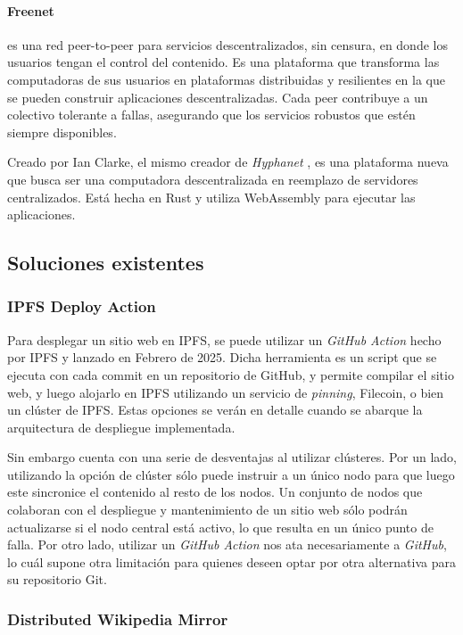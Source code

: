 \paragraph{Freenet} \cite{freenet} es una red peer-to-peer para servicios descentralizados, sin censura, en donde los usuarios tengan el control del contenido. Es una plataforma que transforma las computadoras de sus usuarios en plataformas distribuidas y resilientes en la que se pueden construir aplicaciones descentralizadas. Cada peer contribuye a un colectivo tolerante a fallas, asegurando que los servicios robustos que estén siempre disponibles.

Creado por Ian Clarke, el mismo creador de \textit{Hyphanet} \cite{hyphanet}, es una plataforma nueva que busca ser una computadora descentralizada en reemplazo de servidores centralizados. Está hecha en Rust y utiliza WebAssembly para ejecutar las aplicaciones.


\subsection{Soluciones existentes}

\subsubsection{IPFS Deploy Action}
Para desplegar un sitio web en IPFS, se puede utilizar un \textit{GitHub Action} hecho por IPFS y lanzado en Febrero de 2025. Dicha herramienta es un script que se ejecuta con cada commit en un repositorio de GitHub, y permite compilar el sitio web, y luego alojarlo en IPFS utilizando un servicio de \textit{pinning}, Filecoin, o bien un clúster de IPFS. Estas opciones se verán en detalle cuando se abarque la arquitectura de despliegue implementada.

Sin embargo cuenta con una serie de desventajas al utilizar clústeres. Por un lado, utilizando la opción de clúster sólo puede instruir a un único nodo para que luego este sincronice el contenido al resto de los nodos. Un conjunto de nodos que colaboran con el despliegue y mantenimiento de un sitio web sólo podrán actualizarse si el nodo central está activo, lo que resulta en un único punto de falla. Por otro lado, utilizar un \textit{GitHub Action} nos ata necesariamente a \textit{GitHub}, lo cuál supone otra limitación para quienes deseen optar por otra alternativa para su repositorio Git.

\subsubsection{Distributed Wikipedia Mirror}

